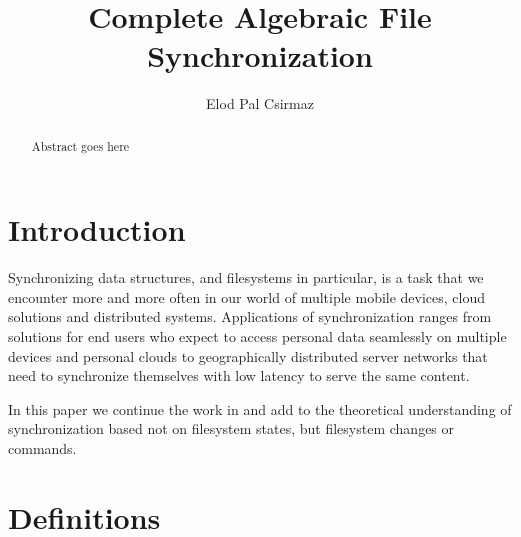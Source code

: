 \documentclass[12pt]{article}
\title{Complete Algebraic File Synchronization}
\author{Elod Pal Csirmaz}
\begin{document}
\maketitle
\begin{abstract}
Abstract goes here
\end{abstract}

\section{Introduction}


Synchronizing data structures, and filesystems in particular,
is a task that we encounter more and more often in our world
of multiple mobile devices, cloud solutions and distributed systems.
Applications of synchronization ranges from
solutions for end users who expect to access personal data seamlessly
on multiple devices and personal clouds to geographically distributed server networks
that need to synchronize themselves with low latency to serve the 
same content.

In this paper we
continue the work in \cite{NREC} and add to the theoretical understanding
of synchronization based not on filesystem states, but filesystem changes or commands.







\section{Definitions}
\end{document}
